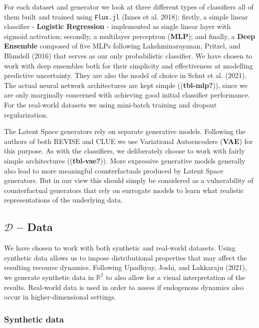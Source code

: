 \documentclass[conference,final,]{IEEEtran}
\begin{document}
For each dataset and generator we look at three different types of classifiers all of them built and trained using \texttt{Flux.jl} (Innes et al. 2018): firstly, a simple linear classifier - \textbf{Logistic Regression} - implemented as single linear layer with sigmoid activation; secondly, a multilayer perceptron (\textbf{MLP}); and finally, a \textbf{Deep Ensemble} composed of five MLPs following Lakshminarayanan, Pritzel, and Blundell (2016) that serves as our only probabilistic classifier. We have chosen to work with deep ensembles both for their simplicity and effectiveness at modelling predictive uncertainty. They are also the model of choice in Schut et al. (2021). The actual neural network architectures are kept simple ((\textbf{tbl-mlp?})), since we are only marginally concerned with achieving good initial classifier performance. For the real-world datasets we using mini-batch training and dropout regularization.

The Latent Space generators rely on separate generative models. Following the authors of both REVISE and CLUE we use Variational Autoencoders (\textbf{VAE}) for this purpose. As with the classifiers, we deliberately choose to work with fairly simple architectures ((\textbf{tbl-vae?})). More expressive generative models generally also lead to more meaningful counterfactuals produced by Latent Space generators. But in our view this should simply be considered as a vulnerability of counterfactual generators that rely on surrogate models to learn what realistic representations of the underlying data.

\hypertarget{empirical-data}{%
\subsection{\texorpdfstring{\(\mathcal{D}\) -- Data}{\textbackslash mathcal\{D\} -- Data}}\label{empirical-data}}

We have chosen to work with both synthetic and real-world datasets. Using synthetic data allows us to impose distributional properties that may affect the resulting recourse dynamics. Following Upadhyay, Joshi, and Lakkaraju (2021), we generate synthetic data in \(\mathbb{R}^2\) to also allow for a visual interpretation of the results. Real-world data is used in order to assess if endogenous dynamics also occur in higher-dimensional settings.

\hypertarget{synthetic-data}{%
\subsubsection{Synthetic data}\label{synthetic-data}}
\end{document}
